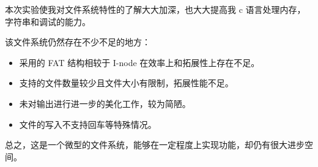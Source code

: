 \documentclass{article}
\begin{document}
本次实验使我对文件系统特性的了解大大加深，也大大提高我 c 语言处理内存，字符串和调试的能力。

该文件系统仍然存在不少不足的地方：

\begin{itemize}
	\item 采用的 FAT 结构相较于 I-node 在效率上和拓展性上存在不足。
	\item 支持的文件数量较少且文件大小有限制，拓展性能不足。
	\item 未对输出进行进一步的美化工作，较为简陋。
	\item 文件的写入不支持回车等特殊情况。
\end{itemize}

总之，这是一个微型的文件系统，能够在一定程度上实现功能，却仍有很大进步空间。
\end{document}
